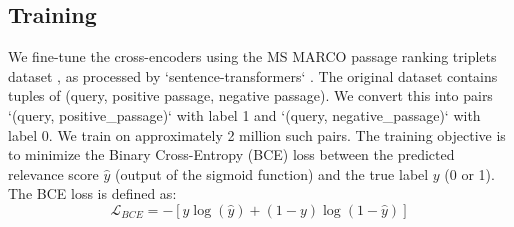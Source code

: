\documentclass[conference]{IEEEtran}
\begin{document}
\subsection{Training}
We fine-tune the cross-encoders using the MS MARCO passage ranking triplets dataset \cite{DBLP:journals/corr/NguyenRSGTMD16}, as processed by `sentence-transformers` \cite{reimers2019sentence}. The original dataset contains tuples of (query, positive passage, negative passage). We convert this into pairs `(query, positive\_passage)` with label 1 and `(query, negative\_passage)` with label 0. We train on approximately 2 million such pairs.
The training objective is to minimize the Binary Cross-Entropy (BCE) loss between the predicted relevance score $\hat{y}$ (output of the sigmoid function) and the true label $y$ (0 or 1). The BCE loss is defined as:
\[ \mathcal{L}_{BCE} = - [y \log(\hat{y}) + (1 - y) \log(1 - \hat{y})] \]

\end{document}
